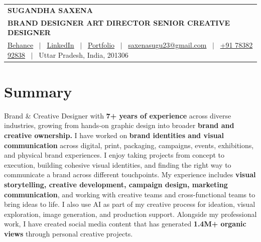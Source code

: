\documentclass[a4paper,9pt]{article}
\begin{document}
\pagestyle{empty}

\begin{tabularx}{\linewidth}{>{\centering\arraybackslash}X}
\Huge{\textbf{\MakeUppercase{Sugandha Saxena}}} \\[5pt]
\large{\textbf{BRAND DESIGNER \textbar{} ART DIRECTOR \textbar{} SENIOR CREATIVE DESIGNER}} \\[5pt]
\href{https://www.behance.net/saxenasugu7614}{Behance} \ $|$ \
\href{https://www.linkedin.com/in/sugandhasaxena/}{LinkedIn} \ $|$ \
\href{https://sugandha-saxena-portfolio.vercel.app/}{Portfolio} \ $|$ \
\href{mailto:saxenasugu23@gmail.com}{saxenasugu23@gmail.com} \ $|$ \
\href{tel:+917838292838}{+91 78382 92838} \ $|$ \
{Uttar Pradesh, India, 201306}
\end{tabularx}

\section{Summary}

Brand \& Creative Designer with \textbf{7+ years of experience} across diverse industries, growing from hands-on graphic design into broader \textbf{brand and creative ownership.} I have worked on \textbf{brand identities and visual communication} across digital, print, packaging, campaigns, events, exhibitions, and physical brand experiences. I enjoy taking projects from concept to execution, building cohesive visual identities, and finding the right way to communicate a brand across different touchpoints. My experience includes \textbf{visual storytelling, creative development, campaign design, marketing communication}, and working with creative teams and cross-functional teams to bring ideas to life. I also use AI as part of my creative process for ideation, visual exploration, image generation, and production support. Alongside my professional work, I have created social media content that has generated \textbf{1.4M+ organic views} through personal creative projects.

\end{document}
